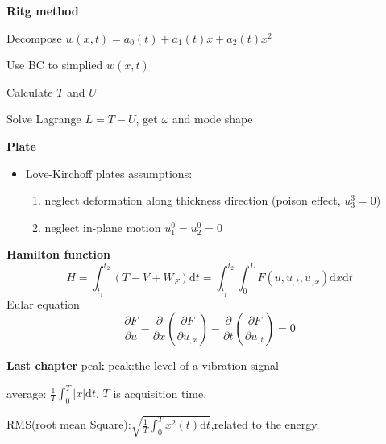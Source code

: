 \documentclass{article}
\begin{document}
\begin{multicols*}{3}
  \noindent\textbf{Ritg method}

 Decompose $w(x,t) = a_0(t) + a_1(t)x + a_2(t)x^2$

Use BC to simplied $w(x,t)$

 Calculate $T$ and $U$

 Solve Lagrange $L = T - U$, get $\omega$ and mode shape


  \noindent\textbf{Plate}
  \begin{itemize}
  \item Love-Kirchoff plates assumptions:
    \begin{enumerate}
    \item neglect deformation along thickness direction (poison effect, $u_3^3=0$)
    \item neglect in-plane motion $u_1^0=u_2^0=0$
    \end{enumerate}
  \end{itemize}




 


 \textbf{Hamilton function}
\begin{equation*}
  H=\int_{t_{1}}^{t_{2}}(T-V+W_{F})\text{d}t
  =\int_{t_{1}}^{t_{2}}\int_{0}^{L}F(u,u_{,t},u_{,x})\text{d}x\text{d}t
\end{equation*}
Eular equation
\begin{equation*}
  \frac{\partial F}{\partial u}-\frac{\partial}{\partial x}(\frac{\partial F}{\partial u_{,x}})-\frac{\partial}{\partial t}(\frac{\partial F}{\partial u_{,t}})=0
\end{equation*}

\noindent\textbf{Last chapter}
peak-peak:the level of a vibration signal

average: $\frac{1}{T}\int_{0}^{T}|x|\text{d}t$, $T$ is acquisition time.

RMS(root mean Square):$\sqrt{\frac{1}{T}\int_{0}^{T}x^{2}(t)\text{d}t}$,related  to the energy.



\end{multicols*}
\end{document}
